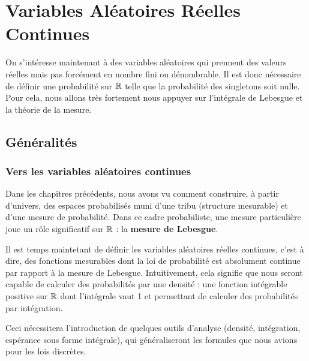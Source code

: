 \chapter{Variables Aléatoires Réelles Continues}

\justify

\setlength{\parindent}{0pt}
\renewcommand{\labelitemi}{\textbullet} %


On s'intéresse maintenant à des variables aléatoires qui prennent des valeurs réelles mais pas forcément en nombre fini ou dénombrable.
Il est donc nécessaire de définir une probabilité sur $\mathbb{R}$ telle que la probabilité des singletons soit nulle.
Pour cela, nous allons très fortement nous appuyer sur l'intégrale de Lebesgue et la théorie de la mesure. 


\section{Généralités}

\subsection{Vers les variables aléatoires continues}

Dans les chapitres précédents, nous avons vu comment construire, à partir d'univers, des espaces probabilisés 
muni d'une tribu (structure mesurable) et d'une mesure de probabilité. Dans ce cadre probabiliste, une mesure particulière 
joue un rôle significatif sur $\mathbb{R}$ : la \textbf{mesure de Lebesgue}. 

Il est temps maintetant de définir les variables aléatoires réelles continues, c'est à dire, 
des fonctions mesurables dont la loi de probabilité est absolument continue par rapport à la mesure de Lebesgue. 
Intuitivement, cela signifie que nous seront capable de calculer des probabilités par une densité : une fonction intégrable 
positive sur $\mathbb{R}$ dont l'intégrale vaut 1 et permettant de calculer des probabilités par intégration. 

Ceci nécessitera l’introduction de quelques outils d’analyse (densité, intégration, espérance sous forme intégrale), 
qui généraliseront les formules que nous avions pour les lois discrètes.

